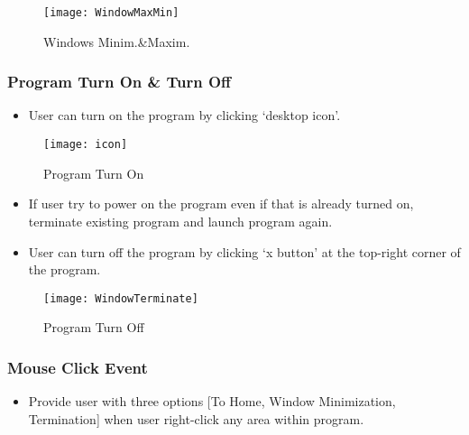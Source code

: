\documentclass[conference,compsoc, twocolumn]{IEEEtran}
\begin{document}
\begin{figure}[H]
\centering\texttt{[image: WindowMaxMin]}
\caption{Windows Minim.\&Maxim.}
\end{figure}

\subsubsection{Program Turn On \& Turn Off}
\begin{itemize}
\item User can turn on the program by clicking ‘desktop icon’.
\end{itemize}

\begin{figure}[H]
\centering\texttt{[image: icon]}
\caption{Program Turn On}
\end{figure}

\begin{itemize}
\item If user try to power on the program even if that is already turned on, terminate existing program and launch program again.
\end{itemize}

\begin{itemize}
\item User can turn off the program by clicking ‘x button’ at the top-right corner of  the program.
\end{itemize}

\begin{figure}[H]
\centering\texttt{[image: WindowTerminate]}
\caption{Program Turn Off}
\end{figure}

\subsubsection{Mouse Click Event}
\begin{itemize}
\item Provide user with three options [To Home, Window Minimization, Termination] when user right-click any area within program.
\end{itemize}
\end{document}
